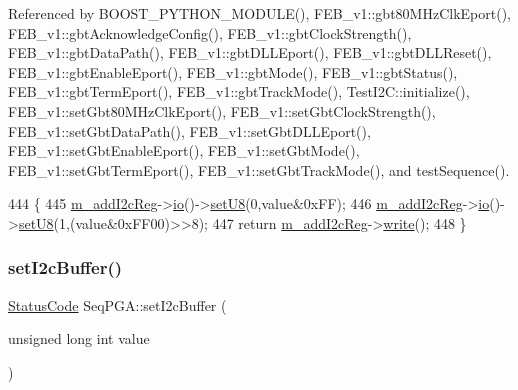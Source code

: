 Referenced by B\+O\+O\+S\+T\+\_\+\+P\+Y\+T\+H\+O\+N\+\_\+\+M\+O\+D\+U\+L\+E(), F\+E\+B\+\_\+v1\+::gbt80\+M\+Hz\+Clk\+Eport(), F\+E\+B\+\_\+v1\+::gbt\+Acknowledge\+Config(), F\+E\+B\+\_\+v1\+::gbt\+Clock\+Strength(), F\+E\+B\+\_\+v1\+::gbt\+Data\+Path(), F\+E\+B\+\_\+v1\+::gbt\+D\+L\+L\+Eport(), F\+E\+B\+\_\+v1\+::gbt\+D\+L\+L\+Reset(), F\+E\+B\+\_\+v1\+::gbt\+Enable\+Eport(), F\+E\+B\+\_\+v1\+::gbt\+Mode(), F\+E\+B\+\_\+v1\+::gbt\+Status(), F\+E\+B\+\_\+v1\+::gbt\+Term\+Eport(), F\+E\+B\+\_\+v1\+::gbt\+Track\+Mode(), Test\+I2\+C\+::initialize(), F\+E\+B\+\_\+v1\+::set\+Gbt80\+M\+Hz\+Clk\+Eport(), F\+E\+B\+\_\+v1\+::set\+Gbt\+Clock\+Strength(), F\+E\+B\+\_\+v1\+::set\+Gbt\+Data\+Path(), F\+E\+B\+\_\+v1\+::set\+Gbt\+D\+L\+L\+Eport(), F\+E\+B\+\_\+v1\+::set\+Gbt\+Enable\+Eport(), F\+E\+B\+\_\+v1\+::set\+Gbt\+Mode(), F\+E\+B\+\_\+v1\+::set\+Gbt\+Term\+Eport(), F\+E\+B\+\_\+v1\+::set\+Gbt\+Track\+Mode(), and test\+Sequence().


\begin{DoxyCode}
444                                                      \{
445   \hyperlink{classSeqPGA_ac3a6aad3fec65ceb78528b6d20deeb3f}{m\_addI2cReg}->\hyperlink{classIOobject_af04fb94137c3d86849f478ac5afab5d1}{io}()->\hyperlink{classIOdata_a6c4fb2f2af01889ada889c2b7aceb24d}{setU8}(0,value&0xFF);
446   \hyperlink{classSeqPGA_ac3a6aad3fec65ceb78528b6d20deeb3f}{m\_addI2cReg}->\hyperlink{classIOobject_af04fb94137c3d86849f478ac5afab5d1}{io}()->\hyperlink{classIOdata_a6c4fb2f2af01889ada889c2b7aceb24d}{setU8}(1,(value&0xFF00)>>8);
447   \textcolor{keywordflow}{return} \hyperlink{classSeqPGA_ac3a6aad3fec65ceb78528b6d20deeb3f}{m\_addI2cReg}->\hyperlink{classIOobject_a9f6984bc9f0fadcf800f1be2523ac744}{write}();
448 \}
\end{DoxyCode}
\mbox{\label{classSeqPGA_ab93beca49a31c1f9fddc915e9efeeaa0}} 
\subsubsection{\texorpdfstring{set\+I2c\+Buffer()}{setI2cBuffer()}}
{\footnotesize\ttfamily \hyperlink{classStatusCode}{Status\+Code} Seq\+P\+G\+A\+::set\+I2c\+Buffer (\begin{DoxyParamCaption}\item[{unsigned long int}]{value }\end{DoxyParamCaption})}



